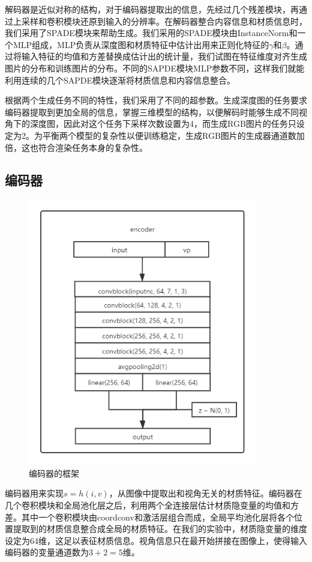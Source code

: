 \documentclass[UTF8,openany,AutoFakeBold,AutoFakeSlant,cs4size]{ctexbook}
\begin{document}
解码器是近似对称的结构，对于编码器提取出的信息，先经过几个残差模块，再通过上采样和卷积模块还原到输入的分辨率。在解码器整合内容信息和材质信息时，我们采用了SPADE模块来帮助生成。我们采用的SPADE模块由InstanceNorm和一个MLP组成，MLP负责从深度图和材质特征中估计出用来正则化特征的$\gamma$和$\beta$。通过将输入特征的均值和方差替换成估计出的统计量，我们试图在特征维度对齐生成图片的分布和训练图片的分布。不同的SAPDE模块MLP参数不同，这样我们就能利用连续的几个SAPDE模块逐渐将材质信息和内容信息整合。

根据两个生成任务不同的特性，我们采用了不同的超参数。生成深度图的任务要求编码器提取到更加全局的信息，掌握三维模型的结构，以便解码时能够生成不同视角下的深度图，因此对这个任务下采样次数设置为4，而生成RGB图片的任务只设定为2。为平衡两个模型的复杂性以便训练稳定，生成RGB图片的生成器通道数加倍，这也符合渲染任务本身的复杂性。


\subsection{编码器}

\begin{figure}
\centering
\includegraphics[width=10cm]{./images/encoder.png}
\caption{编码器的框架}
\label{fig:sample}
\end{figure}

编码器用来实现$s = h(i, v)$，从图像中提取出和视角无关的材质特征。编码器在几个卷积模块和全局池化层之后，利用两个全连接层估计材质隐变量的均值和方差。其中一个卷积模块由coordconv和激活层组合而成，全局平均池化层将各个位置提取到的材质信息整合成全局的材质特征。在我们的实验中，材质隐变量的维度设定为64维，这足以表征材质信息。视角信息只在最开始拼接在图像上，使得输入编码器的变量通道数为$3 + 2 = 5$维。
\end{document}
